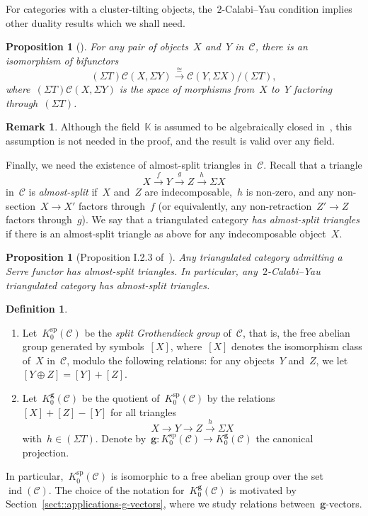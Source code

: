 \documentclass{amsart}
\newtheorem{proposition}[theorem]{Proposition}
\theoremstyle{definition}
\newtheorem{definition}[theorem]{Definition}
\newtheorem{remark}[theorem]{Remark}
\renewcommand{\b}[1]{{\boldsymbol{#1}}} %
\newcommand{\darkblue}{\color{darkblue}} %
\newcommand{\defn}[1]{\textsl{\darkblue #1}} %
\newcommand{\field}{\mathbb{K}}
\newcommand{\cat}{\mathcal{C}}
\newcommand{\susp}{\Sigma}
\newcommand{\spl}{\operatorname{sp}}
\newcommand{\Ksp}{K_0^{\spl}}
\newcommand{\Kg}{K_0^{\b{g}}}
\newcommand{\ind}{\operatorname{ind}}
\begin{document}
For categories with a cluster-tilting objects, the~$2$-Calabi--Yau condition implies other duality results which we shall need.

\begin{proposition}[\cite{Palu}]
 For any pair of objects~$X$ and~$Y$ in~$\cat$, there is an isomorphism of bifunctors
 \[
  (\susp T)\cat(X, \susp Y) \xrightarrow{\cong} \cat(Y, \susp X)/(\susp T),
 \]
 where~$(\susp T)\cat(X, \susp Y)$ is the space of morphisms from~$X$ to~$Y$ factoring through~$(\susp T)$.
\end{proposition}

\begin{remark}
 Although the field~$\field$ is assumed to be algebraically closed in~\cite{Palu}, this assumption is not needed in the proof, and the result is valid over any field.
\end{remark}

Finally, we need the existence of almost-split triangles in~$\cat$.  Recall that a triangle
\[
 X\xrightarrow{f} Y \xrightarrow{g} Z \xrightarrow{h} \susp X
\]
in~$\cat$ is \defn{almost-split} if~$X$ and~$Z$ are indecomposable,~$h$ is non-zero, and any non-section~$X\to X'$ factors through~$f$  (or equivalently, any non-retraction~$Z'\to Z$ factors through~$g$).  We say that a triangulated category \defn{has almost-split triangles} if there is an almost-split triangle as above for any indecomposable object~$X$. 

\begin{proposition}[Proposition I.2.3 of~\cite{ReitenVandenbergh}]
 Any triangulated category admitting a Serre functor has almost-split triangles.  In particular, any~$2$-Calabi--Yau triangulated category has almost-split triangles.
\end{proposition}

\begin{definition}
\label{defi::grothendieck-group}
 \begin{enumerate}
  \item Let~$\Ksp(\cat)$ be the \defn{split Grothendieck group} of~$\cat$, that is, the free abelian group generated by symbols~$[X]$, where~$[X]$ denotes the isomorphism class of~$X$ in~$\cat$, modulo the following relations: for any objects~$Y$ and~$Z$, we let~$[Y\oplus Z] = [Y] + [Z]$. 
  
  \item Let~$\Kg(\cat)$ be the quotient of~$\Ksp(\cat)$ by the relations~$[X]+[Z]-[Y]$ for all triangles
  \[
   X\xrightarrow{} Y \xrightarrow{} Z \xrightarrow{h} \susp X
  \]
  with~$h\in (\susp T)$.  Denote by~$\b g:\Ksp(\cat) \to \Kg(\cat)$ the canonical projection.

 \end{enumerate}

 
\end{definition}
In particular,~$\Ksp(\cat)$ is isomorphic to a free abelian group over the set~$\ind(\cat)$.  The choice of the notation for~$\Kg(\cat)$ is motivated by Section~\ref{sect::applications-g-vectors}, where we study relations between~$\b g$-vectors.
\end{document}
